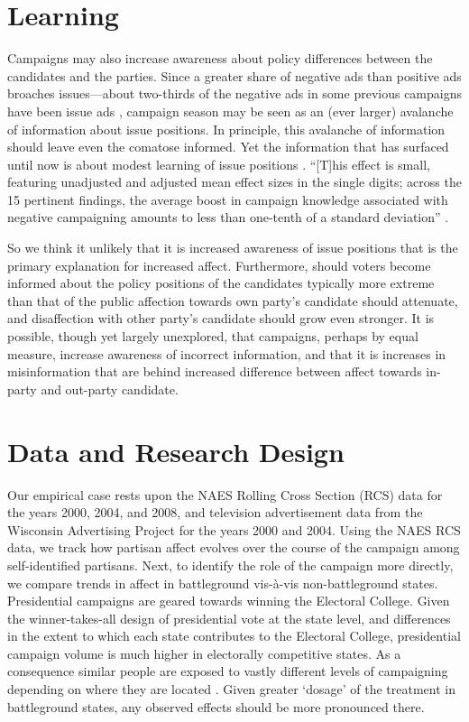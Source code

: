 \documentclass[12pt, letterpaper]{article}
\begin{document}
\section*{Learning}
Campaigns may also increase awareness about policy differences between the candidates and the parties. Since a greater share of negative ads than positive ads broaches issues---about two-thirds of the negative ads in some previous campaigns have been issue ads \citep[][p. 62]{geer2008}, \textemdash campaign season may be seen as an (ever larger) avalanche of information about issue positions. In principle, this avalanche of information should leave even the comatose informed. Yet the information that has surfaced until now is about modest learning of issue positions \citep{geer2008, lau2007, lau2009, zhao1995, ridout2004, ansolabehere1995}. ``[T]his effect is small, featuring unadjusted and adjusted mean effect sizes in the single digits; across the 15 pertinent findings, the average boost in campaign knowledge associated with negative campaigning amounts to less than one-tenth of a standard deviation'' \citep{lau2007}.

So we think it unlikely that it is increased awareness of issue positions that is the primary explanation for increased affect. Furthermore, should voters become informed about the policy positions of the candidates \textemdash typically more extreme than that of the public \citep{fiorina2012} \textemdash affection towards own party's candidate should attenuate, and disaffection with other party's candidate should grow even stronger. It is possible, though yet largely unexplored, that campaigns, perhaps by equal measure, increase awareness of incorrect information, and that it is increases in misinformation that are behind increased difference between affect towards in-party and out-party candidate. 

\section*{Data and Research Design}
Our empirical case rests upon the NAES Rolling Cross Section (RCS) data for the years 2000, 2004, and 2008, and television advertisement data from the Wisconsin Advertising Project for the years 2000 and 2004. Using the NAES RCS data, we track how partisan affect evolves over the course of the campaign among self-identified partisans. Next, to identify the role of the campaign more directly, we compare trends in affect in battleground vis-\`{a}-vis non-battleground states.  Presidential campaigns are geared towards winning the Electoral College. Given the winner-takes-all design of presidential vote at the state level, and differences in the extent to which each state contributes to the Electoral College, presidential campaign volume is much higher in electorally competitive states. As a consequence similar people are exposed to vastly different levels of campaigning depending on where they are located \citep[see][]{ashworth2006, ansolabehere2006}. Given greater `dosage' of the treatment in battleground states, any observed effects should be more pronounced there.
\end{document}
